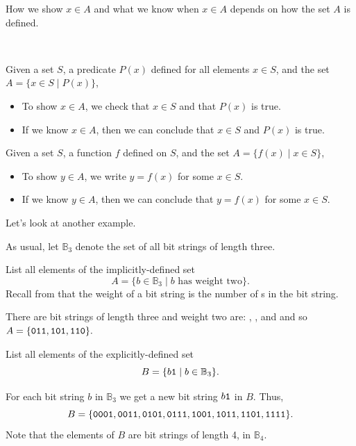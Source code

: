 How we show $x \in A$ and what we know when $x \in A$ depends on how the set $A$ is defined.

\begin{rem}
\label{rem_implicit_explicit_sets}
~
    \begin{apart}
        \item Given a set $S$, a predicate $P(x)$ defined for all elements $x \in S$, and the set $A=\{ x \in S \mid P(x)\}$,
            \begin{itemize}
                \item To show $x \in A$, we check that $x \in S$ and that $P(x)$ is true.  
                \item If we know $x \in A$, then we can conclude that $x \in S$ and $P(x)$ is true.
            \end{itemize}
        \item Given a set $S$, a function $f$ defined on $S$, and the set $A=\{ f(x) \mid x \in S\}$, 
            \begin{itemize}
                \item To show $y \in A$, we write $y=f(x)$ for some $x \in S$.  
                \item If we know $y \in A$, then we can conclude that $y=f(x)$ for some $x \in S$.
            \end{itemize}
    \end{apart}
\end{rem}

Let's look at another example.

\begin{exam}
\label{exam_implicit_explicit_bs}
    As usual, let $\mathbb{B}_3$ denote the set of all bit strings of length three.
        \begin{apart}
            \item List all elements of the implicitly-defined set $$A= \{b \in \mathbb{B}_3 \mid b \text{ has weight two}\}.$$ Recall from  that the weight of a bit string is the number of s in the bit string.
                \begin{soln}
                    There are bit strings of length three and weight two are: , , and  and so $A = \{\texttt{011}, \texttt{101}, \texttt{110}\}.$
                \end{soln}
            \item List all elements of the explicitly-defined set $$B = \{ b\texttt{1} \mid b \in \mathbb{B}_3\}.$$
                \begin{soln}
                    For each bit string $b$ in $\mathbb{B}_3$ we get a new bit string $b\texttt{1}$ in $B$. Thus,
                        $$B = \{\texttt{0001}, \texttt{0011}, \texttt{0101}, \texttt{0111}, \texttt{1001}, \texttt{1011}, \texttt{1101}, \texttt{1111}\}.$$
                    Note that the elements of $B$ are bit strings of length 4, in $\mathbb{B}_4$.
                \end{soln}
        \end{apart}
\end{exam}

